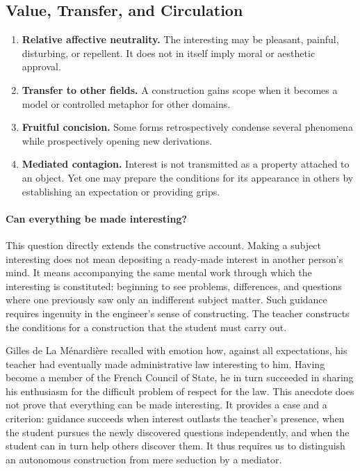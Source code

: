 \documentclass[11pt,a4paper]{article}
\begin{document}
\subsection{Value, Transfer, and Circulation}

\begin{enumerate}[resume]
  \item \textbf{Relative affective neutrality.} The interesting may be
        pleasant, painful, disturbing, or repellent. It does not in itself
        imply moral or aesthetic approval.
  \item \textbf{Transfer to other fields.} A construction gains scope when it
        becomes a model or controlled metaphor for other domains.
  \item \textbf{Fruitful concision.} Some forms retrospectively condense
        several phenomena while prospectively opening new derivations.
  \item \textbf{Mediated contagion.} Interest is not transmitted as a property
        attached to an object. Yet one may prepare the conditions for its
        appearance in others by establishing an expectation or providing
        grips.
\end{enumerate}

\paragraph{Can everything be made interesting?}

This question directly extends the constructive account. Making a subject
interesting does not mean depositing a ready-made interest in another person's
mind. It means accompanying the same mental work through which the interesting
is constituted: beginning to see problems, differences, and questions where
one previously saw only an indifferent subject matter. Such guidance requires
ingenuity in the engineer's sense of constructing. The teacher constructs the
conditions for a construction that the student must carry out.

Gilles de La Ménardière recalled with emotion how, against all expectations,
his teacher had eventually made administrative law interesting to him. Having
become a member of the French Council of State, he in turn succeeded in sharing
his enthusiasm for the difficult problem of respect for the law. This anecdote
does not prove that everything can be made interesting. It provides a case and
a criterion: guidance succeeds when interest outlasts the teacher's presence,
when the student pursues the newly discovered questions independently, and when
the student can in turn help others discover them. It thus requires us to
distinguish an autonomous construction from mere seduction by a mediator.
\end{document}
